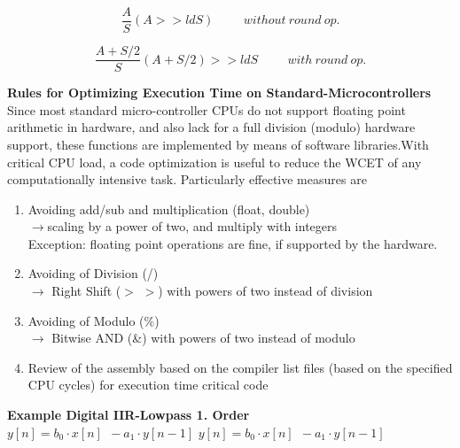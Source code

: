 \begin{equation}
	\frac{A}{S}      (\textit{A} >> \textit{ldS})  \hspace{1cm}    without\ round\ op. \nonumber
\label{EQ }
\end{equation}

\begin{equation}
	\frac{A+S/2}{S}     (\textit{A} + S/2) >> \textit{ldS}  \hspace{1cm}  with\ round\ op. \nonumber
\label{EQ }
\end{equation}

{\rot\bf Rules for Optimizing Execution Time on Standard-Microcontrollers}\\

Since most standard micro-controller CPUs do not support floating point arithmetic in hardware, and also lack for a full division (modulo) hardware support, these functions are implemented by means of software libraries.With critical CPU load, a code optimization is useful to reduce the WCET of any computationally intensive task. Particularly effective measures are

\begin{enumerate}

\item  Avoiding add/sub and multiplication (float, double) \\$\rightarrow$scaling by a power of two, and multiply with integers \\ Exception: floating point operations are fine, if supported by the hardware.

\item  Avoiding of Division (/)\\$\rightarrow$ Right Shift ($\mathrm{>}$ $\mathrm{>}$) with powers of two instead of division

\item  Avoiding of Modulo (\%) \\$\rightarrow$ Bitwise AND (\&) with powers of two instead of modulo

\item  Review of the assembly based on the compiler list files (based on the specified CPU cycles) for execution time critical code
\end{enumerate}

{\rot\bf Example Digital IIR-Lowpass 1. Order }\\

$y[n]=b_{0} \cdot x[n]\; \, -a_{1} \cdot y[n-1]$ $y[n]=b_{0} \cdot x[n]\; \, -a_{1} \cdot y[n-1]$ \\

